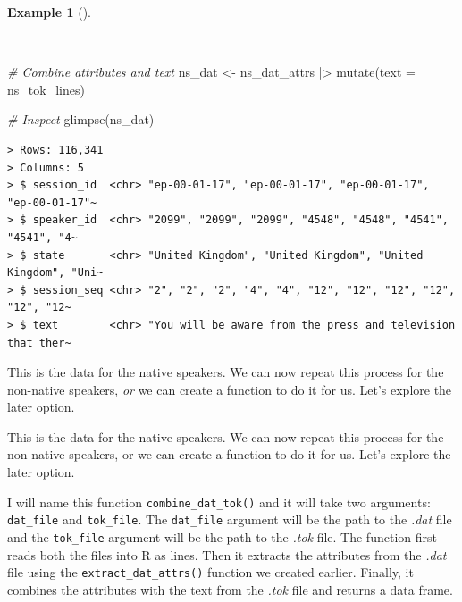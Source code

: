 \documentclass[
  letterpaper,
  DIV=11,
  numbers=noendperiod]{scrreport}
\newenvironment{Shaded}{\begin{snugshade}}{\end{snugshade}}
\newcommand{\AttributeTok}[1]{\textcolor[rgb]{0.00,0.00,0.00}{#1}}
\newcommand{\CommentTok}[1]{\textcolor[rgb]{0.00,0.00,0.00}{\textit{#1}}}
\newcommand{\FunctionTok}[1]{\textcolor[rgb]{0.00,0.00,0.00}{#1}}
\newcommand{\NormalTok}[1]{\textcolor[rgb]{0.00,0.00,0.00}{#1}}
\newcommand{\OtherTok}[1]{\textcolor[rgb]{0.00,0.00,0.00}{#1}}
\newcommand{\SpecialCharTok}[1]{\textcolor[rgb]{0.00,0.00,0.00}{#1}}
\theoremstyle{definition}
\newtheorem{example}{Example}[chapter]
\theoremstyle{remark}
\begin{document}
\begin{example}[]\protect\hypertarget{exm-cd-enntt-combine-attributes-text}{}\label{exm-cd-enntt-combine-attributes-text}

~

\begin{Shaded}
\begin{Highlighting}[]
\CommentTok{\# Combine attributes and text}
\NormalTok{ns\_dat }\OtherTok{\textless{}{-}} 
\NormalTok{  ns\_dat\_attrs }\SpecialCharTok{|\textgreater{}} 
  \FunctionTok{mutate}\NormalTok{(}\AttributeTok{text =}\NormalTok{ ns\_tok\_lines)}

\CommentTok{\# Inspect}
\FunctionTok{glimpse}\NormalTok{(ns\_dat)}
\end{Highlighting}
\end{Shaded}

\begin{verbatim}
> Rows: 116,341
> Columns: 5
> $ session_id  <chr> "ep-00-01-17", "ep-00-01-17", "ep-00-01-17", "ep-00-01-17"~
> $ speaker_id  <chr> "2099", "2099", "2099", "4548", "4548", "4541", "4541", "4~
> $ state       <chr> "United Kingdom", "United Kingdom", "United Kingdom", "Uni~
> $ session_seq <chr> "2", "2", "2", "4", "4", "12", "12", "12", "12", "12", "12~
> $ text        <chr> "You will be aware from the press and television that ther~
\end{verbatim}

\end{example}

This is the data for the native speakers. We can now repeat this process
for the non-native speakers, \emph{or} we can create a function to do it
for us. Let's explore the later option.

This is the data for the native speakers. We can now repeat this process
for the non-native speakers, or we can create a function to do it for
us. Let's explore the later option.

I will name this function \texttt{combine\_dat\_tok()} and it will take
two arguments: \texttt{dat\_file} and \texttt{tok\_file}. The
\texttt{dat\_file} argument will be the path to the \emph{.dat} file and
the \texttt{tok\_file} argument will be the path to the \emph{.tok}
file. The function first reads both the files into R as lines. Then it
extracts the attributes from the \emph{.dat} file using the
\texttt{extract\_dat\_attrs()} function we created earlier. Finally, it
combines the attributes with the text from the \emph{.tok} file and
returns a data frame.
\end{document}
